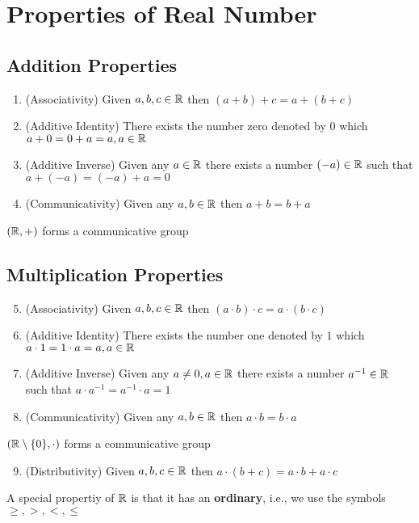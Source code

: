 \chapter{Properties of Real Number}

\section{Addition Properties}

\begin{enumerate}[1.]
  \item (Associativity) Given $a, b, c \in \mathbb R$ then $(a+b)+c = a+(b+c)$
  \item (Additive Identity) There exists the number zero denoted by $0$ which $a + 0 = 0 +a = a, a \in \mathbb R$
  \item (Additive Inverse) Given any $a \in \mathbb R$ there exists a number $(-a) \in \mathbb R$ such that $a + (-a) = (-a) + a = 0$
  \item (Communicativity) Given any $a, b \in \mathbb R$ then $a + b = b + a$
\end{enumerate}

$(\mathbb R, +)$ forms a communicative group

\section{Multiplication Properties}
\begin{enumerate}[1.]
  \setcounter{enumi}{4}
  \item (Associativity) Given $a, b, c \in \mathbb R$ then $(a\cdot b)\cdot c = a\cdot (b\cdot c)$
  \item (Additive Identity) There exists the number one denoted by $1$ which $a \cdot 1 = 1 \cdot a = a, a \in \mathbb R$
  \item (Additive Inverse) Given any $a\neq 0, a \in \mathbb R$ there exists a number $a^{-1} \in \mathbb R$ such that $a \cdot a^{-1} = a^{-1} \cdot a= 1$
  \item (Communicativity) Given any $a, b \in \mathbb R$ then $a \cdot b = b \cdot a$
\end{enumerate}
$(\mathbb R \setminus \{0\}, \cdot)$ forms a communicative group
\begin{enumerate}[1.]
  \setcounter{enumi}{8}
  \item (Distributivity) Given $a, b, c \in \mathbb R$ then $a\cdot(b+c) = a\cdot b + a\cdot c$
\end{enumerate}

A special propertiy of $\mathbb R$ is that it has an \textbf{ordinary}, i.e., we use the symbols $\ge, >, <, \le$

